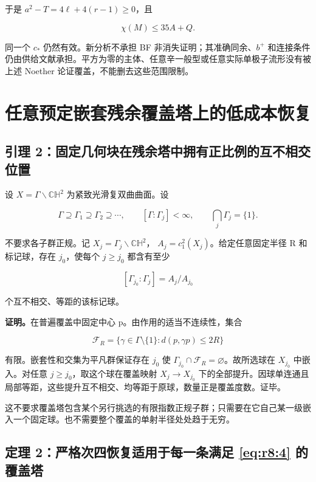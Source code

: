 \documentclass[UTF8,11pt,openany,oneside,fontset=none]{ctexbook}
\begin{document}
于是 \(a^2-T=4\ell+4(r-1)\ge0\)，且

\[
\chi(M)\le35A+Q.
\]

同一个 \(c_*\) 仍然有效。新分析不承担 BF 非消失证明；其准确同余、\(b^+\) 和连接条件仍由供给文献承担。平方为零的主体、任意辛一般型或任意实际单极子流形没有被上述 Noether 论证覆盖，不能删去这些范围限制。

\section{任意预定嵌套残余覆盖塔上的低成本恢复}\label{ch8:ux4efbux610fux9884ux5b9aux5d4cux5957ux6b8bux4f59ux8986ux76d6ux5854ux4e0aux7684ux4f4eux6210ux672cux6062ux590d}

\subsection{引理 2：固定几何块在残余塔中拥有正比例的互不相交位置}\label{ch8:ux5f15ux7406-2ux56faux5b9aux51e0ux4f55ux5757ux5728ux6b8bux4f59ux5854ux4e2dux62e5ux6709ux6b63ux6bd4ux4f8bux7684ux4e92ux4e0dux76f8ux4ea4ux4f4dux7f6e}

设 \(X=\Gamma\backslash\mathbb{CH}^2\) 为紧致光滑复双曲曲面。设

\[
\Gamma\supseteq\Gamma_1\supseteq\Gamma_2\supseteq\cdots,
\qquad [\Gamma:\Gamma_j]<\infty,
\qquad \bigcap_j\Gamma_j=\{1\}.
\tag{8.4}\label{eq:r8:4}
\]

不要求各子群正规。记 \(X_j=\Gamma_j\backslash\mathbb{CH}^2\)， \(A_j=c_1^2(X_j)\)。给定任意固定半径 R 和标记球，存在 \(j_0\)，使每个 \(j\ge j_0\) 都含有至少

\[
[\Gamma_{j_0}:\Gamma_j]=A_j/A_{j_0}
\]

个互不相交、等距的该标记球。

\textbf{证明。}在普遍覆盖中固定中心 p。由作用的适当不连续性，集合

\[
\mathcal F_R=\{\gamma\in\Gamma\setminus\{1\}:d(p,\gamma p)\le2R\}
\]

有限。嵌套性和交集为平凡群保证存在 \(j_0\) 使 \(\Gamma_{j_0}\cap\mathcal F_R=\varnothing\)。故所选球在 \(X_{j_0}\) 中嵌入。对任意 \(j\ge j_0\)，取这个球在覆盖映射 \(X_j\to X_{j_0}\) 下的全部提升。因球单连通且局部等距，这些提升互不相交、均等距于原球，数量正是覆盖度数。证毕。

这不要求覆盖塔包含某个另行挑选的有限指数正规子群；只需要在它自己某一级嵌入一个固定球。也不需要整个覆盖的单射半径处处趋于无穷。

\subsection{\texorpdfstring{定理 2：严格次四恢复适用于每一条满足 \eqref{eq:r8:4} 的覆盖塔}{定理 2：严格次四恢复适用于每一条满足  的覆盖塔}}\label{ch8:ux5b9aux7406-2ux4e25ux683cux6b21ux56dbux6062ux590dux9002ux7528ux4e8eux6bcfux4e00ux6761ux6ee1ux8db3-ux7684ux8986ux76d6ux5854}
\end{document}
